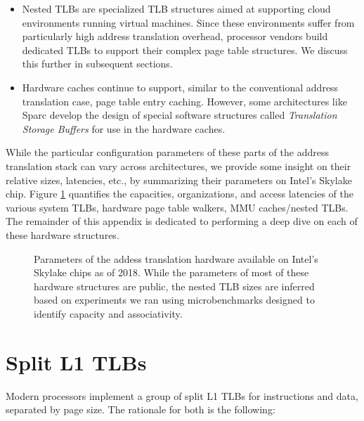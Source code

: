\documentclass{article}
\begin{document}
\begin{itemize}
    \item Nested TLBs are specialized TLB structures aimed at supporting cloud environments running virtual machines. Since these environments suffer from particularly high address translation overhead, processor vendors build dedicated TLBs to support their complex page table structures. We discuss this further in subsequent sections.
    
    \item Hardware caches continue to support, similar to the conventional address translation case, page table entry caching. However, some architectures like Sparc develop the design of special software structures called {\it Translation Storage Buffers} for use in the hardware caches. 
    
\end{itemize}

While the particular configuration parameters of these parts of the address translation stack can vary across architectures, we provide some insight on their relative sizes, latencies, etc., by summarizing their parameters on Intel's Skylake chip. Figure \ref{fig:skylake-parameters} quantifies the capacities, organizations, and access latencies of the various system TLBs, hardware page table walkers, MMU caches/nested TLBs. The remainder of this appendix is dedicated to performing a deep dive on each of these hardware structures.

\begin{figure}[t]
\centering
{
\begin{minipage}[t]{1.00\textwidth}
\centering
\vspace{-10mm}
\vspace{-24mm}
\caption{\small Parameters of the addess translation hardware available on Intel's Skylake chips as of 2018. While the parameters of most of these hardware structures are public, the nested TLB sizes are inferred based on experiments we ran using microbenchmarks designed to identify capacity and associativity.}
\label{fig:skylake-parameters}
\end{minipage}
}
\end{figure}

\section{Split L1 TLBs}\label{sec:split-l1-tlbs}

Modern processors implement a group of split L1 TLBs for instructions and data, separated by page size. The rationale for both is the following:
\end{document}
